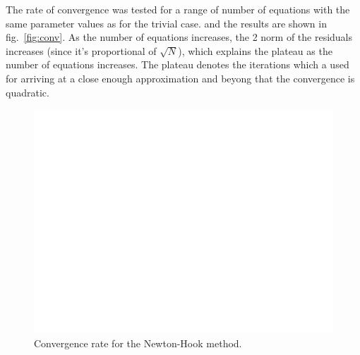 \documentclass[11pt, oneside]{article}
\begin{document}
The rate of convergence was tested for a range of number of equations with the same parameter values as for the trivial case. and the results are shown  in fig.~\ref{fig:conv}. As the number of equations increases, the 2 norm of the residuals increases (since it's proportional of $\sqrt{N}$), which explains the plateau as the number of equations increases. The plateau denotes the iterations which a used for arriving at a close enough approximation and beyong that the convergence is quadratic.
\begin{figure}
  \centering
  \includegraphics{figures/convergence.pdf}
  \caption{Convergence rate for the Newton-Hook method.}
  \label{}
\end{figure}



  
\end{document}
